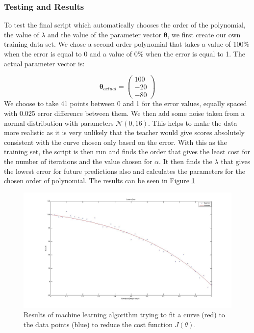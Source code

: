 \documentclass[11pt,a4paper]{article}
\begin{document}
\subsubsection{Testing and Results}
\noindent 
To test the final script which automatically chooses the order of the polynomial, the value of $\lambda$ and the value of the parameter vector $\boldsymbol \theta$, we first create our own training data set. We chose a second order polynomial that takes a value of 100\% when the error is equal to 0 and a value of 0\% when the error is equal to 1.
The actual parameter vector is:

\begin{equation}
\boldsymbol \theta_{actual} = 
\begin{pmatrix}
100\\
-20\\
-80
\end{pmatrix}
\end{equation}
We choose to take 41 points between 0 and 1 for the error values, equally spaced with 0.025 error difference between them. We then add some noise taken from a normal distribution with parameters $\mathcal{N}(0, 16)$. This helps to make the data more realistic as it is very unlikely that the teacher would give scores absolutely consistent with the curve chosen only based on the error. With this as the training set, the script is then run and finds the order that gives the least cost for the number of iterations and the value chosen for $\alpha$. It then finds the $\lambda$ that gives the lowest error for future predictions also and calculates the parameters for the chosen order of polynomial. The results can be seen in Figure \ref{machine_learning_results}

\begin{figure}[H]
\centering
\includegraphics[scale=0.15]{Score_Function_Machine_Learning.jpg}

\caption{Results of machine learning algorithm trying to fit a curve (red) to the data points (blue) to reduce the cost function $J(\theta)$.}
\label{machine_learning_results}
\end{figure}
\end{document}
